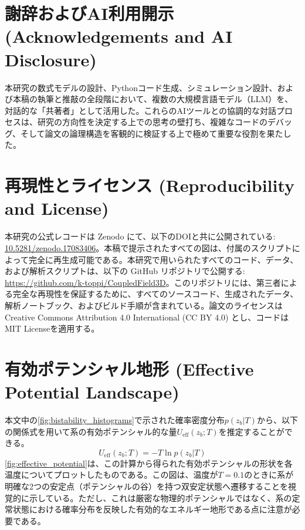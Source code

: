 \documentclass[a4paper,11pt,ja=standard,lualatex]{bxjsarticle}
\newcommand{\figref}[1]{\cref{#1}}
\begin{document}
\section*{謝辞およびAI利用開示 (Acknowledgements and AI Disclosure)}
本研究の数式モデルの設計、Pythonコード生成、シミュレーション設計、および本稿の執筆と推敲の全段階において、複数の大規模言語モデル（LLM）を、対話的な「共著者」として活用した。これらのAIツールとの協調的な対話プロセスは、研究の方向性を決定する上での思考の壁打ち、複雑なコードのデバッグ、そして論文の論理構造を客観的に検証する上で極めて重要な役割を果たした。

\section*{再現性とライセンス (Reproducibility and License)}
\label{sec:reproducibility}
本研究の公式レコードは Zenodo にて、以下のDOIと共に公開されている: \href{https://doi.org/10.5281/zenodo.17083406}{10.5281/zenodo.17083406}。本稿で提示されたすべての図は、付属のスクリプトによって完全に再生成可能である。本研究で用いられたすべてのコード、データ、および解析スクリプトは、以下の GitHub リポジトリで公開する: \url{https://github.com/k-toppi/CoupledField3D}。このリポジトリには、第三者による完全な再現性を保証するために、すべてのソースコード、生成されたデータ、解析ノートブック、およびビルド手順が含まれている。論文のライセンスはCreative Commons Attribution 4.0 International (CC BY 4.0) とし、コードはMIT Licenseを適用する。

\appendix
\section{有効ポテンシャル地形 (Effective Potential Landscape)}
\label{sec:appendix_potential}
本文中の\figref{fig:bistability_histograms}で示された確率密度分布$p(z_b|T)$から、以下の関係式を用いて系の有効ポテンシャル的な量$U_{\mathrm{eff}}(z_b; T)$を推定することができる。
$$ U_{\mathrm{eff}}(z_b; T) = -T \ln p(z_b|T) $$
\figref{fig:effective_potential}は、この計算から得られた有効ポテンシャルの形状を各温度についてプロットしたものである。この図は、温度が$T=0.1$のときに系が明確な2つの安定点（ポテンシャルの谷）を持つ\mbox{双安定}状態へ遷移することを視覚的に示している。ただし、これは厳密な物理的ポテンシャルではなく、系の定常状態における確率分布を反映した有効的なエネルギー地形である点に注意が必要である。
\end{document}
